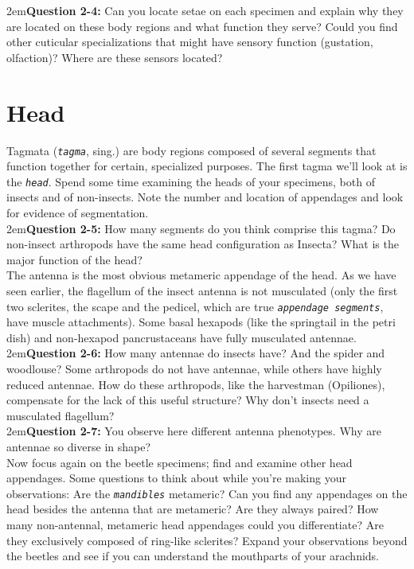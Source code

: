 \documentclass[letterpaper, 11pt]{article}
\newcommand{\latinword}[1]{\texttt{\itshape #1}}%
\begin{document}
\hangindent2em\textbf{Question 2-4:} Can you locate setae on each specimen and explain why they are located on these body regions and what function they serve? Could you find other cuticular specializations that might have sensory function (gustation, olfaction)? Where are these sensors located?\\

\section{Head}
Tagmata (\latinword{tagma}, sing.) are body regions composed of several segments that function together for certain, specialized purposes. The first tagma we'll look at is the \latinword{head}. Spend some time examining the heads of your specimens, both of insects and of non-insects. Note the number and location of appendages and look for evidence of segmentation. \\

\hangindent2em\textbf{Question 2-5:} How many segments do you think comprise this tagma? Do non-insect arthropods have the same head configuration as Insecta? What is the major function of the head? \\

\noindent{}The antenna is the most obvious metameric appendage of the head. As we have seen earlier, the flagellum of the insect antenna is not musculated (only the first two sclerites, the scape and the pedicel, which are true \latinword{appendage segments}, have muscle attachments). Some basal hexapods (like the springtail in the petri dish) and non-hexapod pancrustaceans have fully musculated antennae. \\

\hangindent2em\textbf{Question 2-6:} How many antennae do insects have? And the spider and woodlouse? Some arthropods do not have antennae, while others have highly reduced antennae. How do these arthropods, like the harvestman (Opiliones), compensate for the lack of this useful structure? Why don't insects need a musculated flagellum?\\

\hangindent2em\textbf{Question 2-7:} You observe here different antenna phenotypes. Why are antennae so diverse in shape?\\

\noindent{}Now focus again on the beetle specimens; find and examine other head appendages. Some questions to think about while you're making your observations: Are the \latinword{mandibles} metameric? Can you find any appendages on the head besides the antenna that are metameric? Are they always paired? How many non-antennal, metameric head appendages could you differentiate? Are they exclusively composed of ring-like sclerites? Expand your observations beyond the beetles and see if you can understand the mouthparts of your arachnids.\\
\end{document}
